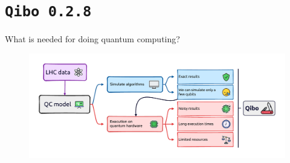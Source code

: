 \documentclass[aspectratio=169, 8pt, xcolor={svgnames}, hyperref={linkcolor=black}]{beamer}
\begin{document}
\section{\texttt{Qibo 0.2.8}}

\begin{frame}{What is needed for doing quantum computing?}
\begin{figure}
   \includegraphics[width=1\linewidth]{figures/qc_onchip.pdf}
\end{figure}  
\end{frame}
\end{document}

